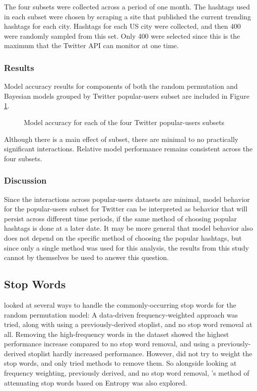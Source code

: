 \documentclass[man,floatsintext,donotrepeattitle]{apa6}
\begin{document}
The four subsets were collected across a period of one month.
The hashtags used in each subset were chosen by scraping a site that published the current trending hashtags for each city.
Hashtags for each US city were collected, and then 400 were randomly sampled from this set.
Only 400 were selected since this is the maximum that the Twitter API can monitor at one time.

\subsubsection{Results}

Model accuracy results for components of both the random permutation and Bayesian models grouped by Twitter popular-users subset are included in Figure \ref{figContextSubsets}.

\begin{figure}[!htbp]
  \caption{Model accuracy for each of the four Twitter popular-users subsets}
  \label{figContextSubsets}
\end{figure}

Although there is a main effect of subset, there are minimal to no practically significant interactions.
Relative model performance remains consistent across the four subsets.

\subsubsection{Discussion}

Since the interactions across popular-users datasets are minimal, model behavior for the popular-users subset for Twitter can be interpreted as behavior that will persist across different time periods,
if the same method of choosing popular hashtags is done at a later date.
It may be more general that model behavior also does not depend on the specific method of choosing the popular hashtags, but since only a single method was used for this analysis,
the results from this study cannot by themselves be used to answer this question.

\subsection{Stop Words}

\textcite{Sahlgren2008} looked at several ways to handle the commonly-occurring stop words for the random permutation model:
A data-driven frequency-weighted approach was tried, along with using a previously-derived stoplist, and no stop word removal at all.
Removing the high-frequency words in the dataset showed the highest performance increase compared to no stop word removal, and using a previously-derived stoplist hardly increased performance.
However, \citeauthor{Sahlgren2008} did not try to weight the stop words, and only tried methods to remove them.
So alongside looking at frequency weighting, previously derived, and no stop word removal, \textcite{Stanley2013}'s method of attenuating stop words based on Entropy was also explored.
\end{document}
